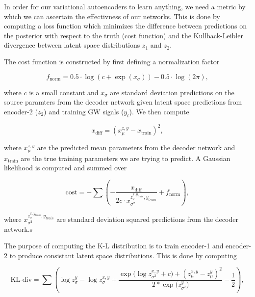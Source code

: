 \documentclass{nature}
\begin{document}
%
%
In order for our variational autoencoders to learn anything, we need a metric by which 
we can ascertain the effectivness of our networks. This is done by computing 
a loss function which minimizes the difference 
between predictions on the posterior with respect to the truth (cost function) and the Kullback-Leibler divergence 
between latent space distributions $z_1$ and $z_2$. 

%
%
The cost function is constructed by first defining a normalization factor

\begin{equation}
    f_{\textrm{norm}} = 0.5 \cdot \log(c + \exp(x_{\sigma})) - 0.5 \cdot \log(2\pi),
\end{equation}

where $c$ is a small constant and $x_{\sigma}$ are standard deviation predictions 
on the source paramters from the decoder network given latent space predictions 
from encoder-2 ($z_2$) and training GW sigals ($y_{t}$). We then 
compute 

\begin{equation}
    x_{\textrm{diff}} = (x^{z,y}_{\mu} - x_{\textrm{train}})^{2},
\end{equation}

where $x^{z,y}_{\mu}$ are the predicted mean parameters from the decoder network 
and $x_{\textrm{train}}$ are the true training parameters we are 
trying to predict. A Gaussian likelihood is computed and summed over

\begin{equation}
    \textrm{cost} = - \sum (-\frac{x_{\textrm{diff}}}{2c \cdot 
    x^{z^{x,y_{train}}_{\sigma},y_{train}}_{\sigma^{2}}} + f_{\textrm{norm}}),\label{eq:cost}
\end{equation}

where $x^{z^{x,y_{train}}_{\sigma},y_{train}}_{\sigma^{2}}$ are standard deviation squared predictions from the 
decoder network.s


%
%
The purpose of computing the K-L distribution is to train 
encoder-1 and encoder-2 to produce consistant latent space 
distributions. This is done by computing 

\begin{equation}
    \textrm{KL-div} = \sum(\log{z^{y}_{\sigma}}-\log{z^{x,y}_{\sigma}}
    +\frac{\exp{(\log{z^{x,y}_{\sigma^{2}}+c)}}+(z^{x,y}_{\mu}-z^{y}_{\mu})^{2}}{2*\exp{(z^{y}_{\sigma^{2}}})}
    -\frac{1}{2}),\label{eq:kl}
\end{equation}
\end{document}
